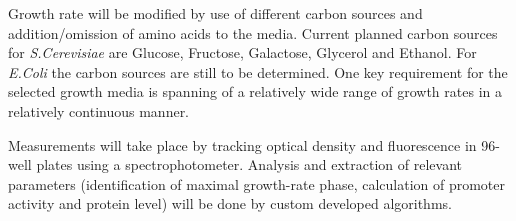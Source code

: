 \documentclass[a4page,notitlepage]{article}
\begin{document}
Growth rate will be modified by use of different carbon sources and addition/omission of amino acids to the media.
Current planned carbon sources for \emph{S.Cerevisiae} are Glucose, Fructose, Galactose, Glycerol and Ethanol.
For \emph{E.Coli} the carbon sources are still to be determined.
One key requirement for the selected growth media is spanning of a relatively wide range of growth rates in a relatively continuous manner.

Measurements will take place by tracking optical density and fluorescence in 96-well plates using a spectrophotometer.
Analysis and extraction of relevant parameters (identification of maximal growth-rate phase, calculation of promoter activity and protein level) will be done by custom developed algorithms.


\end{document}
